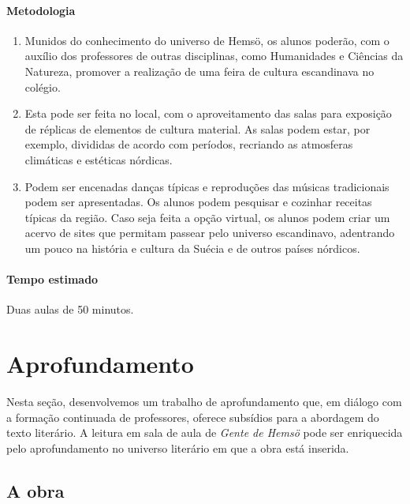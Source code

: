 \documentclass[12pt]{extarticle}
\begin{document}
\paragraph{Metodologia}

\begin{enumerate}

\item
Munidos do conhecimento do universo de Hemsö, os alunos
poderão, com o auxílio dos professores de outras disciplinas, 
como Humanidades e Ciências da Natureza, 
promover a realização de uma feira de cultura escandinava no colégio. 

\item
Esta pode ser feita no local, com o aproveitamento das salas para exposição 
de réplicas de elementos de cultura material. As salas podem estar, por 
exemplo, divididas de acordo com períodos, recriando as atmosferas 
climáticas e estéticas nórdicas.

\item
Podem ser encenadas danças típicas e reproduções das músicas tradicionais 
podem ser apresentadas. Os alunos podem pesquisar e cozinhar receitas 
típicas da região. Caso seja feita a opção virtual, os alunos podem criar 
um acervo de sites que permitam passear pelo universo escandinavo, 
adentrando um pouco na história e cultura da Suécia e de outros países 
nórdicos.

\end{enumerate}

\paragraph{Tempo estimado} Duas aulas de 50 minutos.


\section{Aprofundamento}

Nesta seção, desenvolvemos um trabalho de aprofundamento que, em diálogo
com a formação continuada de professores, oferece subsídios para a
abordagem do texto literário. A leitura em sala de aula de \emph{Gente
de Hemsö} pode ser enriquecida pelo aprofundamento no universo literário
em que a obra está inserida.

\subsection{A obra}
\end{document}
